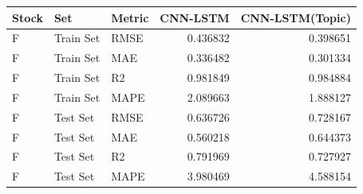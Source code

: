 \begin{tabular}{lllrr}
\toprule
Stock & Set & Metric & CNN-LSTM & CNN-LSTM(Topic) \\
\midrule
F & Train Set & RMSE & 0.436832 & 0.398651 \\
F & Train Set & MAE & 0.336482 & 0.301334 \\
F & Train Set & R2 & 0.981849 & 0.984884 \\
F & Train Set & MAPE & 2.089663 & 1.888127 \\
F & Test Set & RMSE & 0.636726 & 0.728167 \\
F & Test Set & MAE & 0.560218 & 0.644373 \\
F & Test Set & R2 & 0.791969 & 0.727927 \\
F & Test Set & MAPE & 3.980469 & 4.588154 \\
\bottomrule
\end{tabular}
